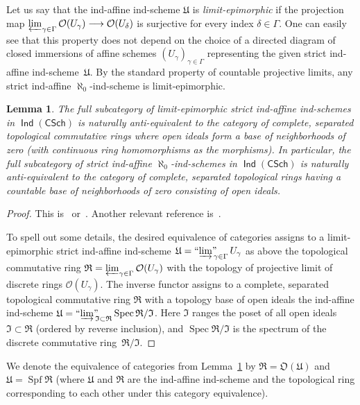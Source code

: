\documentclass[12pt,a4paper]{amsart}
\newcommand{\+}{\protect\nobreakdash-}
\renewcommand{\:}{\colon}
\newcommand{\rarrow}{\longrightarrow}
\DeclareMathOperator{\Spec}{Spec}
\DeclareMathOperator{\Spf}{Spf}
\DeclareMathOperator{\Ind}{\mathsf{Ind}}
\newcommand{\CSch}{\mathsf{CSch}}
\newcommand{\ilim}
 {\mathop{\text{\normalfont``$\varinjlim$''\!\!}}\nolimits}
\newcommand{\cO}{\mathcal O}
\newcommand{\fR}{\mathfrak R}
\newcommand{\fU}{\mathfrak U}
\newcommand{\fI}{\mathfrak I}
\newcommand{\fO}{\mathfrak O}
\theoremstyle{plain}
\newtheorem{lem}[thm]{Lemma}
\theoremstyle{definition}
\begin{document}
 Let us say that the ind-affine ind-scheme $\fU$ is
\emph{limit-epimorphic} if the projection map
$\varprojlim_{\gamma\in\Gamma}\cO(U_\gamma)\rarrow\cO(U_\delta)$
is surjective for every index $\delta\in\Gamma$.
 One can easily see that this property does not depend on the choice
of a directed diagram of closed immersions of affine schemes
$(U_\gamma)_{\gamma\in\Gamma}$ representing the given strict
ind-affine ind-scheme~$\fU$.
 By the standard property of countable projective limits, any strict
ind-affine $\aleph_0$\+ind-scheme is limit-epimorphic.

\begin{lem} \label{limit-epimorphic-ind-affine-ind-schemes}
 The full subcategory of limit-epimorphic strict ind-affine ind-schemes
in\/ $\Ind(\CSch)$ is naturally anti-equivalent to the category
of complete, separated topological commutative rings where open ideals
form a base of neighborhoods of zero (with continuous ring
homomorphisms as the morphisms).
 In particular, the full subcategory of strict ind-affine\/
$\aleph_0$\+ind-schemes in\/ $\Ind(\CSch)$ is naturally
anti-equivalent to the category of complete, separated topological
rings having a countable base of neighborhoods of zero consisting of
open ideals.
\end{lem}

\begin{proof}
 This is~\cite[Section~7.11.2(i)]{BD2} or~\cite[Examples~1.6
and the subsequent paragraph]{Psemten}.
 Another relevant reference is~\cite[Theorem~9.4(a)]{Pextop}.

 To spell out some details, the desired equivalence of categories
assigns to a limit-epimorphic strict ind-affine ind-scheme $\fU=
\ilim_{\gamma\in\Gamma}U_\gamma$ as above the topological commutative
ring $\fR=\varprojlim_{\gamma\in\Gamma}\cO(U_\gamma)$ with
the topology of projective limit of discrete rings $\cO(U_\gamma)$.
 The inverse functor assigns to a complete, separated topological
commutative ring $\fR$ with a topology base of open ideals
the ind-affine ind-scheme $\fU=\ilim_{\fI\subset\fR}\Spec\fR/\fI$.
 Here $\fI$ ranges the poset of all open ideals $\fI\subset\fR$
(ordered by reverse inclusion), and $\Spec\fR/\fI$ is the spectrum
of the discrete commutative ring~$\fR/\fI$.
\end{proof}

 We denote the equivalence of categories from
Lemma~\ref{limit-epimorphic-ind-affine-ind-schemes} by
$\fR=\fO(\fU)$ and $\fU=\Spf\fR$ (where $\fU$ and $\fR$ are
the ind-affine ind-scheme and the topological ring corresponding
to each other under this category equivalence).
\end{document}
